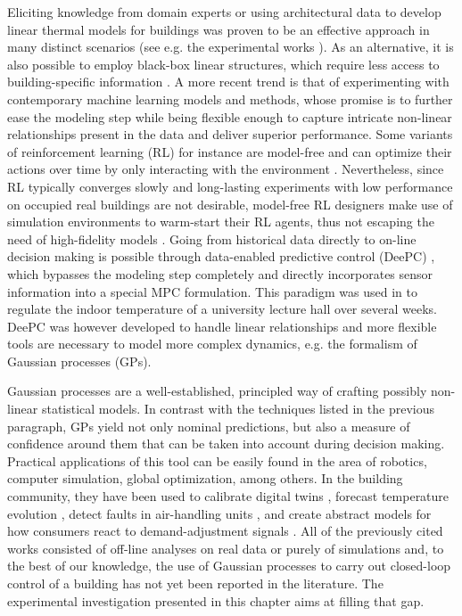 Eliciting knowledge from domain experts or using architectural data to develop linear thermal models for buildings was proven to be an effective approach in many distinct scenarios (see e.g. the experimental works \cite{vavna2014model,bunning2022physics}). As an alternative, it is also possible to employ black-box linear structures, which require less access to building-specific information \citep{fabietti2016experimental,fabietti2018multi}. A more recent trend is that of experimenting with contemporary machine learning models and methods, whose promise is to further ease the modeling step while being flexible enough to capture intricate non-linear relationships present in the data and deliver superior performance. Some variants of reinforcement learning (RL) for instance are model-free and can optimize their actions over time by only interacting with the environment \citep{du2021intelligent}. Nevertheless, since RL typically converges slowly and long-lasting experiments with low performance on occupied real buildings are not desirable, model-free RL designers make use of simulation environments to warm-start their RL agents, thus not escaping the need of high-fidelity models \citep{di2022lessons}. Going from historical data directly to on-line decision making is possible through data-enabled predictive control (DeePC)  \citep{coulson2019data}, which bypasses the modeling step completely and directly incorporates sensor information into a special MPC formulation. This paradigm was used in \cite{lian2021adaptive} to regulate the indoor temperature of a university lecture hall over several weeks. DeePC was however developed to handle linear relationships and more flexible tools are necessary to model more complex dynamics, e.g. the formalism of Gaussian processes (GPs).

Gaussian processes are a well-established, principled way of crafting possibly non-linear statistical models. In contrast with the techniques listed in the previous paragraph, GPs yield not only nominal predictions, but also a measure of confidence around them that can be taken into account during decision making. Practical applications of this tool can be easily found in the area of robotics, computer simulation, global optimization, among others. In the building community, they have been used to calibrate digital twins \citep{chakrabarty2021scalable}, forecast temperature evolution \citep{gray2016thermal}, detect faults in air-handling units \citep{van2017advanced}, and create abstract models for how consumers react to demand-adjustment signals \citep{nghiem2017data}. All of the previously cited works consisted of off-line analyses on real data or purely of simulations and, to the best of our knowledge, the use of Gaussian processes to carry out closed-loop control of a building has not yet been reported in the literature. The experimental investigation presented in this chapter aims at filling that gap.

